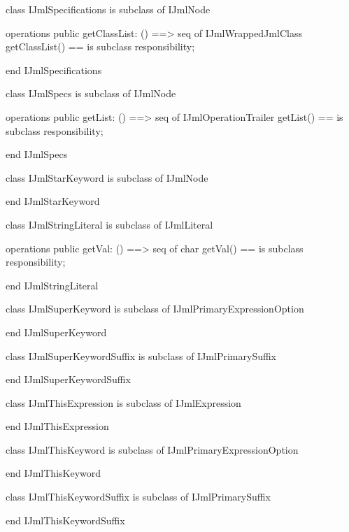 \begin{vdm_al}
class IJmlSpecifications
 is subclass of IJmlNode

operations
  public getClassList: () ==> seq of IJmlWrappedJmlClass
  getClassList() == is subclass responsibility;

end IJmlSpecifications
\end{vdm_al}

\begin{vdm_al}
class IJmlSpecs
 is subclass of IJmlNode

operations
  public getList: () ==> seq of IJmlOperationTrailer
  getList() == is subclass responsibility;

end IJmlSpecs
\end{vdm_al}

\begin{vdm_al}
class IJmlStarKeyword
 is subclass of IJmlNode

end IJmlStarKeyword
\end{vdm_al}

\begin{vdm_al}
class IJmlStringLiteral
 is subclass of IJmlLiteral

operations
  public getVal: () ==> seq of char
  getVal() == is subclass responsibility;

end IJmlStringLiteral
\end{vdm_al}

\begin{vdm_al}
class IJmlSuperKeyword
 is subclass of IJmlPrimaryExpressionOption

end IJmlSuperKeyword
\end{vdm_al}

\begin{vdm_al}
class IJmlSuperKeywordSuffix
 is subclass of IJmlPrimarySuffix

end IJmlSuperKeywordSuffix
\end{vdm_al}

\begin{vdm_al}
class IJmlThisExpression
 is subclass of IJmlExpression

end IJmlThisExpression
\end{vdm_al}

\begin{vdm_al}
class IJmlThisKeyword
 is subclass of IJmlPrimaryExpressionOption

end IJmlThisKeyword
\end{vdm_al}

\begin{vdm_al}
class IJmlThisKeywordSuffix
 is subclass of IJmlPrimarySuffix

end IJmlThisKeywordSuffix
\end{vdm_al}

